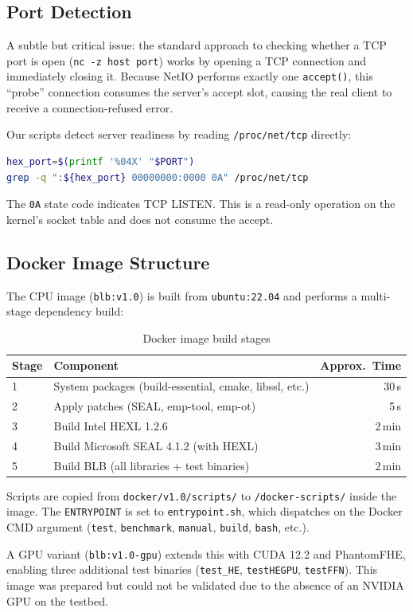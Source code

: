 \subsection{Port Detection}\label{sec:portdetect}

A subtle but critical issue: the standard approach to checking whether a TCP port is open (\texttt{nc -z host port}) works by opening a TCP connection and immediately closing it.
Because NetIO performs exactly one \texttt{accept()}, this ``probe'' connection consumes the server's accept slot, causing the real client to receive a connection-refused error.

Our scripts detect server readiness by reading \texttt{/proc/net/tcp} directly:
\begin{lstlisting}[language=bash]
hex_port=$(printf '%04X' "$PORT")
grep -q ":${hex_port} 00000000:0000 0A" /proc/net/tcp
\end{lstlisting}
The \texttt{0A} state code indicates TCP LISTEN.
This is a read-only operation on the kernel's socket table and does not consume the accept.

\subsection{Docker Image Structure}

The CPU image (\texttt{blb:v1.0}) is built from \texttt{ubuntu:22.04} and performs a multi-stage dependency build:

\begin{table}[h]
\centering
\caption{Docker image build stages}
\label{tab:docker-stages}
\begin{tabular}{llr}
\toprule
Stage & Component & Approx.\ Time \\
\midrule
1 & System packages (build-essential, cmake, libssl, etc.) & 30\,s \\
2 & Apply patches (SEAL, emp-tool, emp-ot) & 5\,s \\
3 & Build Intel HEXL 1.2.6 & 2\,min \\
4 & Build Microsoft SEAL 4.1.2 (with HEXL) & 3\,min \\
5 & Build BLB (all libraries + test binaries) & 2\,min \\
\bottomrule
\end{tabular}
\end{table}

Scripts are copied from \texttt{docker/v1.0/scripts/} to \texttt{/docker-scripts/} inside the image.
The \texttt{ENTRYPOINT} is set to \texttt{entrypoint.sh}, which dispatches on the Docker CMD argument (\texttt{test}, \texttt{benchmark}, \texttt{manual}, \texttt{build}, \texttt{bash}, etc.).

A GPU variant (\texttt{blb:v1.0-gpu}) extends this with CUDA 12.2 and PhantomFHE, enabling three additional test binaries (\texttt{test\_HE}, \texttt{testHEGPU}, \texttt{testFFN}).
This image was prepared but could not be validated due to the absence of an NVIDIA GPU on the testbed.
